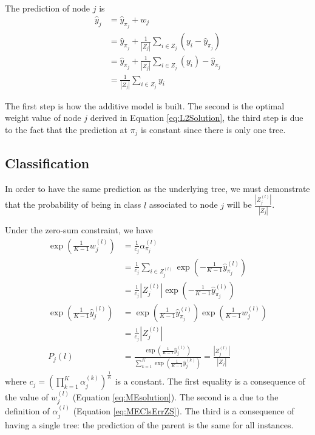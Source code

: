 \documentclass{article}
\begin{document}
The prediction of node $j$ is
\begin{align}\label{eq:EquivL2Solution}
\hat{y}_j &= \hat{y}_{\pi_j} + w_j \\
&= \hat{y}_{\pi_j} +  \frac{1}{|Z_j|} \sum_{i \in Z_j} \left(y_i - 
\hat{y}_{\pi_j}\right) \\
&= \hat{y}_{\pi_j} + \frac{1}{|Z_j|} \sum_{i \in Z_j} \left( y_i \right) - 
\hat{y}_{\pi_j} \\
&= \frac{1}{|Z_j|} \sum_{i \in Z_j}  y_i 
\end{align}


The first step is how the additive model is built. The second is the optimal 
weight value of node $j$ derived in Equation \ref{eq:L2Solution}, the third 
step is due to the fact that the prediction at $\pi_j$ is constant since there 
is only one tree.

\subsection{Classification}
In order to have the same prediction as the underlying tree, we must 
demonstrate that the probability of being in class $l$ associated to node $j$ 
will be $\frac{|Z_j^{(l)}|}{|Z_j|}$.

Under the zero-sum constraint, we have
\begin{align} 
\exp \left(  \frac{1}{K-1} w_j^{(l)}\right) &= \frac{1}{c_j} 
\alpha_{\pi_j}^{(l)} \\
&=  \frac{1}{c_j} \sum_{i \in Z_j^{(l)}} \exp \left(-\frac{1}{K-1} 
\hat{y}_{\pi_j}^{(l)}\right)\\
&= \frac{1}{c_j} |Z_j^{(l)}| \exp \left(-\frac{1}{K-1} 
\hat{y}_{\pi_j}^{(l)}\right) \\
\exp \left(\frac{1}{K-1} \hat{y}_j^{(l)} \right) &= \exp \left(\frac{1}{K-1} 
\hat{y}_{\pi_j}^{(l)} \right) \exp \left(\frac{1}{K-1} w_j^{(l)}\right) \\
&= \frac{1}{c_j} |Z_j^{(l)}| \\
P_j(l) &= \frac{\exp \left(\frac{1}{K-1} \hat{y}_j^{(l)}
\right)}{\sum_{k=1}^K\exp \left(\frac{1}{K-1} \hat{y}_j^{(k)} \right)} = 
\frac{|Z_j^{(l)}|}{|Z_j|}
\end{align}	
where $c_j = \left(\prod_{k=1}^K \alpha_j^{(k)}\right)^{\frac{1}{K}}$ is a 
constant. The first equality is a consequence of the value of $w_j^{(l)}$ 
(Equation \ref{eq:MEsolution}). The second is a due to the definition of 
$\alpha_j^{(l)}$ (Equation \ref{eq:MEClsErrZS}). The third is a consequence of 
having a single tree: the prediction of the parent is the same for all 
instances.
\end{document}
